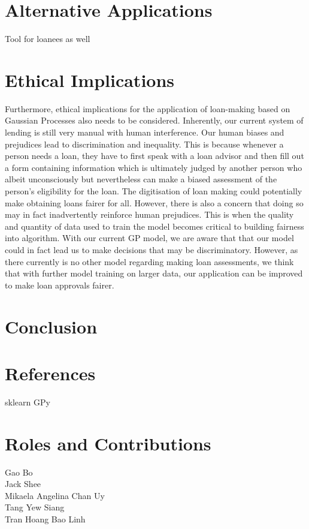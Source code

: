 \documentclass[a4paper]{article}
\theoremstyle{genius}
\begin{document}
\section{Alternative Applications}

Tool for loanees as well

\section{Ethical Implications}

Furthermore, ethical implications for the application of loan-making based on Gaussian Processes also needs to be considered. Inherently, our current system of lending is still very manual with human interference. Our human biases and prejudices lead to discrimination and inequality. This is because whenever a person needs a loan, they have to first speak with a loan advisor and then fill out a form containing information which is ultimately judged by another person who albeit unconsciously but nevertheless can make a biased assessment of the person’s eligibility for the loan. The digitisation of loan making could potentially make obtaining loans fairer for all. However, there is also a concern that doing so may in fact inadvertently reinforce human prejudices. This is when the quality and quantity of data used to train the model becomes critical to building fairness into algorithm. With our current GP model, we are aware that that our model could in fact lead us to make decisions that may be discriminatory. However, as there currently is no other model regarding making loan assessments, we think that with further model training on larger data, our application can be improved to make loan approvals fairer.  

\section{Conclusion}

\section{References}
sklearn
GPy

\section{Roles and Contributions}

\begin{description}
\item [Gao Bo]
\item [Jack Shee]
\item [Mikaela Angelina Chan Uy] 
\item [Tang Yew Siang]
\item [Tran Hoang Bao Linh]
\end{description}
\end{document}
